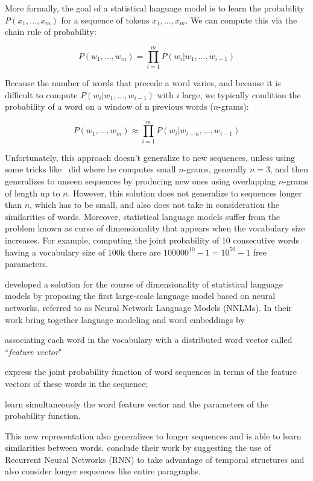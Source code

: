 More formally, the goal of a statistical language model is to learn the probability $P(x_1, \dots, x_m)$ for a sequence of tokens $x_1, \dots, x_m$. We can compute this via the chain rule of probability:

\begin{equation}
P\left(w_{1}, \ldots, w_{m}\right)=\prod_{i=1}^{m} P\left(w_{i} | w_{1}, \dots, w_{i-1}\right)
\end{equation}

Because the number of words that precede a word varies, and because it is difficult to compute $P(w_i | w_1,\dots, w_{i-1})$ with $i$ large, we typically condition the probability of a word on a window of n previous words ($n$-grams): 


\begin{equation}
P\left(w_{1}, \ldots, w_{m}\right) \approx \prod_{i=1}^{m} P\left(w_{i} | w_{i-n}, \dots, w_{i-1}\right)
\end{equation}

Unfortunately, this approach doesn't generalize to new sequences, unless using some tricks like~\citet{katz1987probablm} did where he computes small $n$-grams, generally $n=3$, and then generalizes to unseen sequences by producing new ones using overlapping $n$-grams of length up to $n$. However, this solution does not generalize to sequences longer than $n$, which has to be small, and also does not take in consideration the similarities of words. Moreover, statistical language models suffer from the problem known as curse of dimensionality that appears when the vocabulary size increases. For example, computing the joint probability of 10 consecutive words having a vocabulary size of 100k there are $100000^{10} - 1 = 10^{50} - 1$ free parameters. 

\citet{bengio2000nnlm} developed a solution for the course of dimensionality of statistical language models by proposing the first large-scale language model based on neural networks, referred to as Neural Network Language Models (NNLMs). In their work \citet{bengio2000nnlm} bring together language modeling and word embeddings by \begin {enumerate*} [1) ]
\item associating each word in the vocabulary with a distributed word vector called ``\textit{feature vector}" \item express the joint probability function of word sequences in terms of the feature vectors of these words in the sequence; \item learn simultaneously the word feature vector and the parameters of the probability function.
\end {enumerate*} This new representation also generalizes to longer sequences and is able to learn similarities between words. \citet{bengio2000nnlm} conclude their work by suggesting the use of Recurrent Neural Networks (RNN) to take advantage of temporal structures and also consider longer sequences like entire paragraphs.

